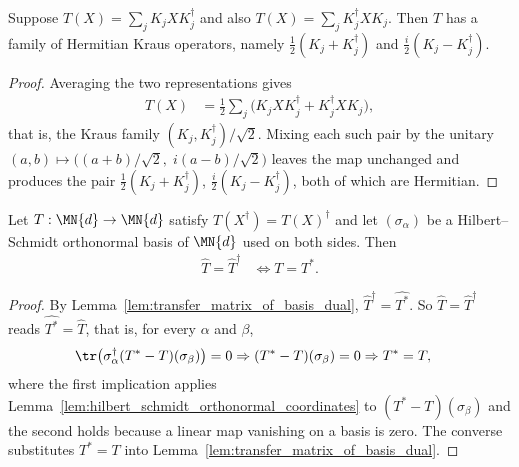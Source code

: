 \begin{lemma}
    \label{lem:hermitian_kraus_of_self_dual}
    \leanok
    Suppose $T(X)=\sum_j K_j X K_j^\dagger$ and also
    $T(X)=\sum_j K_j^\dagger X K_j$. Then $T$ has a family of Hermitian Kraus
    operators, namely $\tfrac12(K_j+K_j^\dagger)$ and
    $\tfrac{i}{2}(K_j-K_j^\dagger)$.
\end{lemma}

\begin{proof}\leanok
    Averaging the two representations gives
    \begin{align}
        T(X)
        &= \frac12\sum_j\bigl(K_jXK_j^\dagger+K_j^\dagger XK_j\bigr),
    \end{align}
    that is, the Kraus family $(K_j,K_j^\dagger)/\sqrt2$. Mixing each such pair
    by the unitary $(a,b)\mapsto\bigl((a+b)/\sqrt2,\;i(a-b)/\sqrt2\bigr)$ leaves
    the map unchanged and produces the pair $\tfrac12(K_j+K_j^\dagger)$,
    $\tfrac{i}{2}(K_j-K_j^\dagger)$, both of which are Hermitian.
\end{proof}

\begin{lemma}
    \label{lem:transfer_matrix_of_basis_hermitian_iff}
    \leanok
    Let $T:\MN{d}\to\MN{d}$ satisfy $T(X^\dagger)=T(X)^\dagger$ and let
    $(\sigma_\alpha)$ be a Hilbert--Schmidt orthonormal basis of $\MN{d}$ used on
    both sides. Then
    \begin{align}
        \widehat T=\widehat T^\dagger
        &\iff T=T^*.
    \end{align}
\end{lemma}

\begin{proof}\leanok
    By Lemma~\ref{lem:transfer_matrix_of_basis_dual},
    $\widehat T^\dagger=\widehat{T^*}$. So $\widehat T=\widehat T^\dagger$ reads
    $\widehat{T^*}=\widehat T$, that is, for every $\alpha$ and $\beta$,
    \begin{align}
        \tr\bigl(\sigma_\alpha^\dagger(T^*-T)(\sigma_\beta)\bigr)=0
        &\Rightarrow (T^*-T)(\sigma_\beta)=0 \Rightarrow T^*=T,
    \end{align}
    where the first implication applies
    Lemma~\ref{lem:hilbert_schmidt_orthonormal_coordinates} to
    $(T^*-T)(\sigma_\beta)$ and the second holds because a linear map vanishing
    on a basis is zero. The converse substitutes $T^*=T$ into
    Lemma~\ref{lem:transfer_matrix_of_basis_dual}.
\end{proof}

